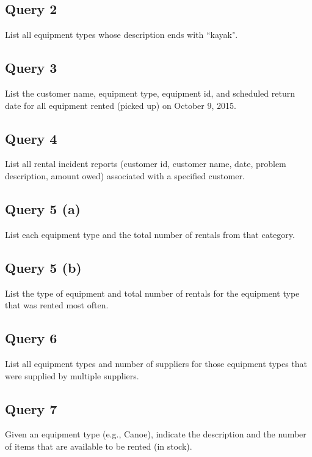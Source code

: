 \documentclass[12pt]{article}
\begin{document}
\subsection*{Query 2}
List all equipment types whose description ends with ``kayak".

\subsection*{Query 3}
List the customer name, equipment type, equipment id, and scheduled return date
for all equipment rented (picked up) on October 9, 2015.

\subsection*{Query 4}
List all rental incident reports (customer id, customer name, date, problem
description, amount owed) associated with a specified customer.

\subsection*{Query 5 (a)}
List each equipment type and the total number of rentals from that category.

\subsection*{Query 5 (b)}
List the type of equipment and total number of rentals for the equipment type
that was rented most often.

\subsection*{Query 6}
List all equipment types and number of suppliers for those equipment types that
were supplied by multiple suppliers.

\subsection*{Query 7}
Given an equipment type (e.g., Canoe), indicate the description and the number
of items that are available to be rented (in stock).

\end{document}
